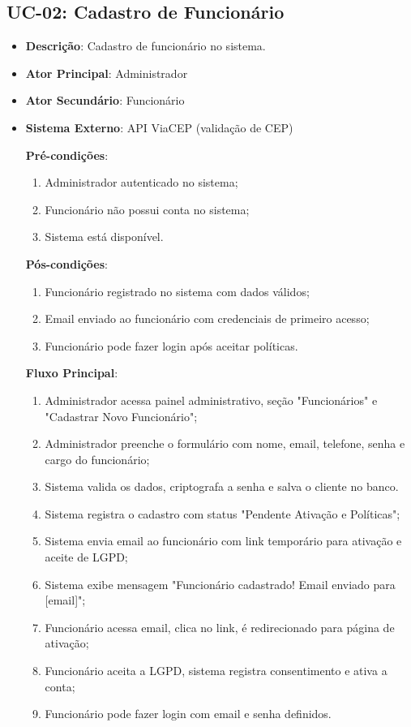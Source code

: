 \subsection{UC-02: Cadastro de Funcionário}

\begin{itemize}[topsep=1pt, itemsep=0pt]
  \item[]\textbf{Descrição}: Cadastro de funcionário no sistema.

  \item[]\textbf{Ator Principal}: Administrador
  \item[]\textbf{Ator Secundário}: Funcionário

  \item[]\textbf{Sistema Externo}: API ViaCEP (validação de CEP)

  \textbf{Pré-condições}:
  \begin{enumerate}
    \item Administrador autenticado no sistema;
    \item Funcionário não possui conta no sistema;
    \item Sistema está disponível.
  \end{enumerate}

  \textbf{Pós-condições}:
  \begin{enumerate}
    \item Funcionário registrado no sistema com dados válidos;
    \item Email enviado ao funcionário com credenciais de primeiro acesso;
    \item Funcionário pode fazer login após aceitar políticas.
  \end{enumerate}

  \textbf{Fluxo Principal}:
  \begin{enumerate}
    \item Administrador acessa painel administrativo, seção "Funcionários" e "Cadastrar Novo Funcionário";
    \item Administrador preenche o formulário com nome, email, telefone, senha e cargo do funcionário;
    \item Sistema valida os dados, criptografa a senha e salva o cliente no banco.
    \item Sistema registra o cadastro com status "Pendente Ativação e Políticas";
    \item Sistema envia email ao funcionário com link temporário para ativação e aceite de LGPD;
    \item Sistema exibe mensagem "Funcionário cadastrado! Email enviado para [email]";
    \item Funcionário acessa email, clica no link, é redirecionado para página de ativação;
    \item Funcionário aceita a LGPD, sistema registra consentimento e ativa a conta;
    \item Funcionário pode fazer login com email e senha definidos.
  \end{enumerate}


\end{itemize}
